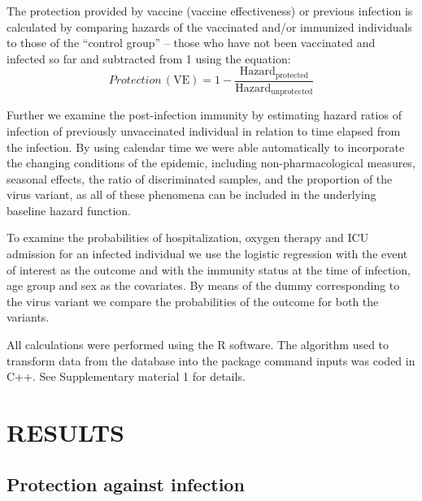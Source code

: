 \documentclass[a4paper,12pt]{article}
\begin{document}
The protection provided by vaccine (vaccine effectiveness) or previous infection is calculated by comparing hazards of the vaccinated and/or immunized individuals to those of the  ``control group'' -- those who have not been vaccinated and infected so far and subtracted from 1 using the equation:
\begin{equation}
Protection\, (\mbox{VE}) = 1 -  \frac{\mathrm{Hazard_{protected}}}{\mathrm{Hazard_{unprotected}}}
\label{eq1}
\end{equation}

Further we examine the post-infection immunity by estimating hazard ratios of infection of previously unvaccinated individual in relation to time elapsed from the infection. By using calendar time we were able automatically to incorporate the changing conditions of the epidemic, including non-pharmacological measures, seasonal effects, the ratio of discriminated samples, and the proportion of the virus variant, as all of these phenomena can be included in the underlying baseline hazard function. 

To examine the probabilities of hospitalization, oxygen therapy and ICU admission for an infected individual we use the logistic regression with the event of interest as the outcome and with the immunity status at the time of infection, age group and sex as the covariates. By means of the dummy corresponding to the virus variant we compare the probabilities of the outcome for both the variants.

 
All calculations were performed using the R software. The algorithm used to transform data from the database into the package command inputs was coded in C++. See Supplementary material 1 for details. 



\section*{RESULTS}
\label{sec3}

\subsection*{Protection against infection}
\end{document}
